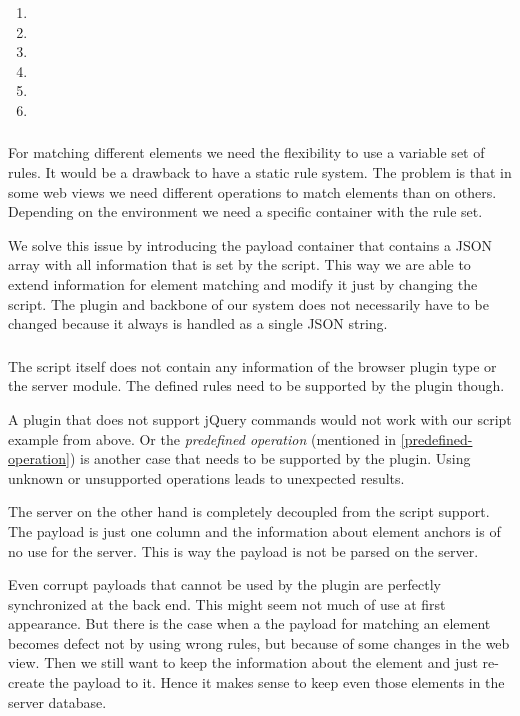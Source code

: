 \begin{enumerate}
\item \reqSi
\item \reqSii
\item \reqSiii
\item \reqSiv
\item \reqSv
\item \reqSvi
\end{enumerate}

\subsubsection[Information Container]{\reqSi}

For matching different elements we need the flexibility to use a variable set of rules. It would be a drawback to have a static rule system. The problem is that in some web views we need different operations to match elements than on others. Depending on the environment we need a specific container with the rule set. 

We solve this issue by introducing the payload container that contains a JSON array with all information that is set by the script. This way we are able to extend information for element matching and modify it just by changing the script. The plugin and backbone of our system does
 not
 necessarily have to be changed because it always is handled as a single JSON string.

\subsubsection[Decoupling]{\reqSii}\label{decoupled-req}

The script itself does
 not
 contain any information of the browser plugin type or the server module. The defined rules need to be supported by the plugin though. 

A plugin that does
 not
 support jQuery commands would not work with our script example from above. Or the \emph{predefined operation} (mentioned in \ref{predefined-operation}) is another case that needs to be supported by the plugin. Using unknown or unsupported operations leads to unexpected results.  

The server on the other hand is completely decoupled from the script support. The payload is just one column and the information about element anchors is of no use for the server. This is way the payload is not be parsed on the server. 

Even corrupt payloads that cannot be used by the plugin are perfectly synchronized at the back end. This might seem not much of use at first appearance. But there is the case when a the payload for matching an element becomes defect not by using wrong rules, but because of some changes in the web view. Then we still want to keep the information about the element and just re-create the payload to it. Hence it makes sense to keep even those elements in the server database.

